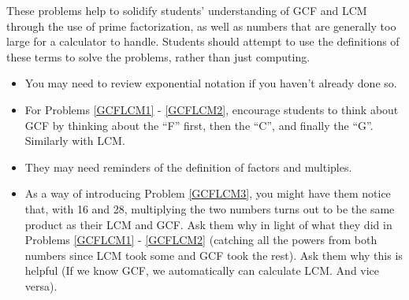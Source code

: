 \documentclass{ximera}
\begin{document}
\begin{instructorNotes}
These problems help to solidify students' understanding of GCF and LCM through the use of prime factorization, as well as numbers that are generally too large for a calculator to handle.  Students should attempt to use the definitions of these terms to solve the problems, rather than just computing.

\begin{itemize}
    \item You may need to review exponential notation if you haven't already done so.
	\item For Problems \ref{GCFLCM1} - \ref{GCFLCM2}, encourage students to think about GCF by thinking about the ``F'' first, then the ``C'', and finally the ``G''.  Similarly with LCM.
	\item They may need reminders of the definition of factors and multiples.
	\item As a way of introducing Problem \ref{GCFLCM3}, you might have them notice that, with 16 and 28, multiplying the two numbers turns out to be the same product as their LCM and GCF.  Ask them why in light of what they did in Problems \ref{GCFLCM1} - \ref{GCFLCM2} (catching all the powers from both numbers since LCM took some and GCF took the rest).  Ask them why this is helpful (If we know GCF, we automatically can calculate LCM.  And vice versa).
\end{itemize}
\end{instructorNotes}
\end{document}
